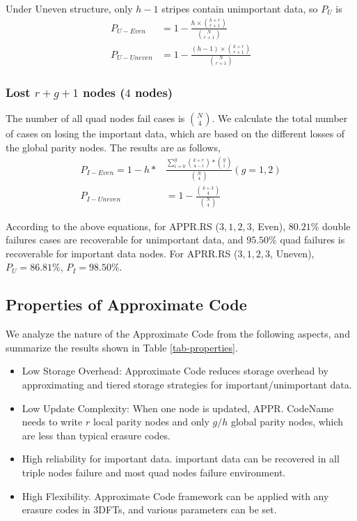 \documentclass[sigconf]{acmart}
\begin{document}
Under Uneven structure, only $h-1$ stripes contain unimportant data, so $P_{U}$ is
\begin{align}
    P_{U-Even} &= 1 - \frac{h \times \binom{k+r}{r+1}}{\binom{N}{r+1}}\\
    P_{U-Uneven} &= 1 - \frac{(h-1) \times \binom{k+r}{r+1}}{\binom{N}{r+1}}
\end{align}

\subsubsection{Lost $r+g+1$ nodes ($4$ nodes)}
The number of all quad nodes fail cases is $\binom{N}{4}$.
We calculate the total number of cases on losing the important data, which are based on the different losses of the global parity nodes. The results are as follows,
\begin{align}
    P_{I-Even} = 1 - h*&\frac{\sum_{i=0}^{g} {\binom{k+r}{4-i}*\binom{g}{i}} }{\binom{N}{4}}  (g=1,2)\\
    P_{I-Uneven} &= 1 - \frac{\binom{k+3}{4}}{\binom{N}{4}}
\end{align}

According to the above equations, for APPR.RS ($3,1,2,3$, Even), $80.21\%$ double failures cases are recoverable for unimportant data, and $95.50\%$ quad failures is recoverable for important data nodes. For APRR.RS ($3,1,2,3$, Uneven), $P_U=86.81\%$, $P_{I}=98.50\%$.

\subsection{Properties of Approximate Code}\label{properties}

We analyze the nature of the Approximate Code from the following aspects, and summarize the results shown in Table \ref{tab-properties}.
\begin{itemize}
    \item Low Storage Overhead: Approximate Code reduces storage overhead by approximating and tiered storage strategies for important/unimportant data. 
    \item Low Update Complexity: When one node is updated, APPR. CodeName needs to write $r$ local parity nodes and only $g/h$ global parity nodes, which are less than typical erasure codes.
    \item High reliability for important data. important data can be recovered in all triple nodes failure and most quad nodes failure environment.
    \item High Flexibility. Approximate Code framework can be applied with any erasure codes in 3DFTs, and various parameters can be set.
\end{itemize}
\end{document}
